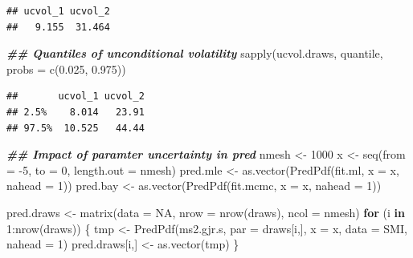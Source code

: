 \documentclass[
]{article}
\newenvironment{Shaded}{\begin{snugshade}}{\end{snugshade}}
\newcommand{\AttributeTok}[1]{\textcolor[rgb]{0.77,0.63,0.00}{#1}}
\newcommand{\ConstantTok}[1]{\textcolor[rgb]{0.00,0.00,0.00}{#1}}
\newcommand{\ControlFlowTok}[1]{\textcolor[rgb]{0.13,0.29,0.53}{\textbf{#1}}}
\newcommand{\DecValTok}[1]{\textcolor[rgb]{0.00,0.00,0.81}{#1}}
\newcommand{\DocumentationTok}[1]{\textcolor[rgb]{0.56,0.35,0.01}{\textbf{\textit{#1}}}}
\newcommand{\FloatTok}[1]{\textcolor[rgb]{0.00,0.00,0.81}{#1}}
\newcommand{\FunctionTok}[1]{\textcolor[rgb]{0.00,0.00,0.00}{#1}}
\newcommand{\NormalTok}[1]{#1}
\newcommand{\OtherTok}[1]{\textcolor[rgb]{0.56,0.35,0.01}{#1}}
\newcommand{\SpecialCharTok}[1]{\textcolor[rgb]{0.00,0.00,0.00}{#1}}
\begin{document}
\begin{verbatim}
## ucvol_1 ucvol_2 
##   9.155  31.464
\end{verbatim}

\begin{Shaded}
\begin{Highlighting}[]
\DocumentationTok{\#\# Quantiles of unconditional volatility}
\FunctionTok{sapply}\NormalTok{(ucvol.draws, quantile, }\AttributeTok{probs =} \FunctionTok{c}\NormalTok{(}\FloatTok{0.025}\NormalTok{, }\FloatTok{0.975}\NormalTok{))}
\end{Highlighting}
\end{Shaded}

\begin{verbatim}
##       ucvol_1 ucvol_2
## 2.5%    8.014   23.91
## 97.5%  10.525   44.44
\end{verbatim}

\begin{Shaded}
\begin{Highlighting}[]
\DocumentationTok{\#\# Impact of paramter uncertainty in pred}
\NormalTok{nmesh }\OtherTok{\textless{}{-}} \DecValTok{1000}
\NormalTok{x }\OtherTok{\textless{}{-}} \FunctionTok{seq}\NormalTok{(}\AttributeTok{from =} \SpecialCharTok{{-}}\DecValTok{5}\NormalTok{, }\AttributeTok{to =} \DecValTok{0}\NormalTok{, }\AttributeTok{length.out =}\NormalTok{ nmesh)}
\NormalTok{pred.mle }\OtherTok{\textless{}{-}} \FunctionTok{as.vector}\NormalTok{(}\FunctionTok{PredPdf}\NormalTok{(fit.ml, }\AttributeTok{x =}\NormalTok{ x, }\AttributeTok{nahead =} \DecValTok{1}\NormalTok{))}
\NormalTok{pred.bay }\OtherTok{\textless{}{-}} \FunctionTok{as.vector}\NormalTok{(}\FunctionTok{PredPdf}\NormalTok{(fit.mcmc, }\AttributeTok{x =}\NormalTok{ x, }\AttributeTok{nahead =} \DecValTok{1}\NormalTok{))}

\NormalTok{pred.draws }\OtherTok{\textless{}{-}} \FunctionTok{matrix}\NormalTok{(}\AttributeTok{data =} \ConstantTok{NA}\NormalTok{, }\AttributeTok{nrow =} \FunctionTok{nrow}\NormalTok{(draws), }\AttributeTok{ncol =}\NormalTok{ nmesh)}
\ControlFlowTok{for}\NormalTok{ (i }\ControlFlowTok{in} \DecValTok{1}\SpecialCharTok{:}\FunctionTok{nrow}\NormalTok{(draws)) \{}
\NormalTok{  tmp }\OtherTok{\textless{}{-}} \FunctionTok{PredPdf}\NormalTok{(ms2.gjr.s, }\AttributeTok{par =}\NormalTok{ draws[i,], }\AttributeTok{x =}\NormalTok{ x, }\AttributeTok{data =}\NormalTok{ SMI, }\AttributeTok{nahead =} \DecValTok{1}\NormalTok{)}
\NormalTok{  pred.draws[i,] }\OtherTok{\textless{}{-}} \FunctionTok{as.vector}\NormalTok{(tmp)}
\NormalTok{\}}
\end{Highlighting}
\end{Shaded}
\end{document}
